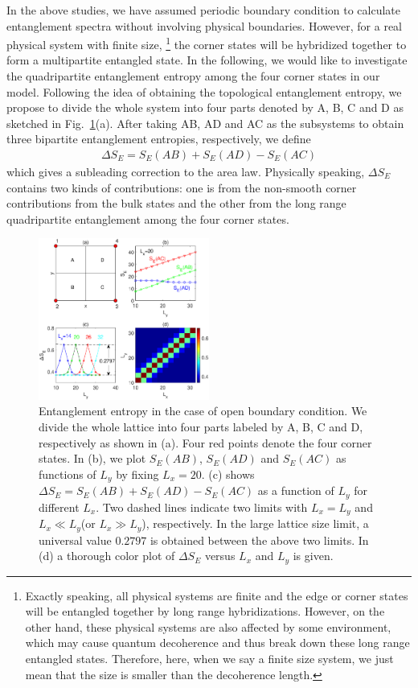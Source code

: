 \documentclass[twocolumn,superscriptaddress]{revtex4-1}
\begin{document}
In the above studies, we have assumed periodic boundary condition to calculate entanglement spectra without involving physical boundaries. However, for a real physical system with finite size, \footnote{Exactly speaking, all physical systems are finite and the edge or corner states will be entangled together by long range hybridizations. However, on the other hand, these physical systems are also affected by some environment, which may cause quantum decoherence and thus break down these long range entangled states. Therefore, here, when we say a finite size system, we just mean that the size is smaller than the decoherence length.} the corner states will be hybridized together to form a multipartite entangled state. In the following, we would like to investigate the quadripartite entanglement entropy among the four corner states in our model. Following the idea of obtaining the topological entanglement entropy, \cite{Kitaev_PRL_2006, Levin_PRL_2006} we propose to divide the whole system into four parts denoted by A, B, C and D as sketched in Fig.~\ref{fig:quadripartite}(a). After taking AB, AD and AC as the subsystems to obtain three bipartite entanglement entropies, respectively, we define
\begin{eqnarray}
  \Delta S_E=S_E(AB)+S_E(AD)-S_E(AC)
\end{eqnarray}
which gives a subleading correction to the area law. Physically speaking, $\Delta S_E$ contains two kinds of contributions: one is from the non-smooth corner contributions from the bulk states and the other from the long range quadripartite entanglement among the four corner states.

\begin{figure}
    \includegraphics[width=0.5\textwidth]{quadripartite.eps}
    \caption{\label{fig:quadripartite} Entanglement entropy in the case of open boundary condition. We divide the whole lattice into four parts labeled by A, B, C and D, respectively as shown in (a). Four red points denote the four corner states. In (b), we plot $S_E(AB)$, $S_E(AD)$ and $S_E(AC)$ as functions of $L_y$ by fixing $L_x=20$. (c) shows $\Delta S_E=S_E(AB)+S_E(AD)-S_E(AC)$ as a function of $L_y$ for different $L_x$. Two dashed lines indicate two limits with $L_x=L_y$ and $L_x\ll L_y$(or $L_x\gg L_y$), respectively. In the large lattice size limit, a universal value $0.2797$ is obtained between the above two limits. In (d) a thorough color plot of $\Delta S_E$ versus $L_x$ and $L_y$ is given.}
\end{figure}
\end{document}
